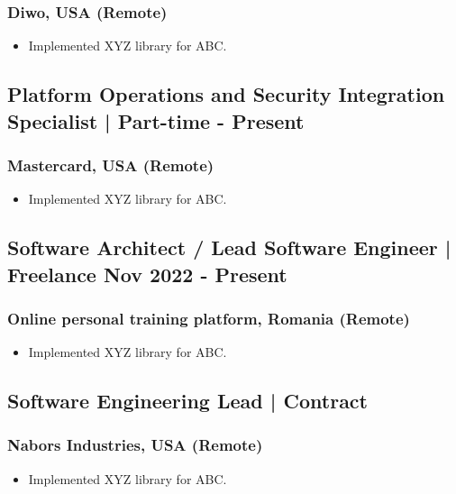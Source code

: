 \documentclass[11pt]{article}
\begin{document}
    \subsubsection{Diwo, USA (Remote)}
    \begin{itemize}
        \item[\checkmark]  Implemented XYZ library for ABC.
    \end{itemize}
    
    \subsection{Platform Operations and Security Integration Specialist | Part-time \hfill {} - Present}
    \subsubsection{Mastercard, USA (Remote)}
    \begin{itemize}
        \item[\checkmark]  Implemented XYZ library for ABC.
    \end{itemize}
    
    \subsection{Software Architect / Lead Software Engineer | Freelance \hfill \normalfont Nov 2022 - Present}
    \subsubsection{Online personal training platform, Romania (Remote)}
    \begin{itemize}
        \item[\checkmark]  Implemented XYZ library for ABC.
    \end{itemize}
    
    \subsection{Software Engineering Lead | Contract \hfill {}}
    \subsubsection{Nabors Industries, USA (Remote)}
    \begin{itemize}
        \item[\checkmark]  Implemented XYZ library for ABC.
    \end{itemize}
    
\end{document}

